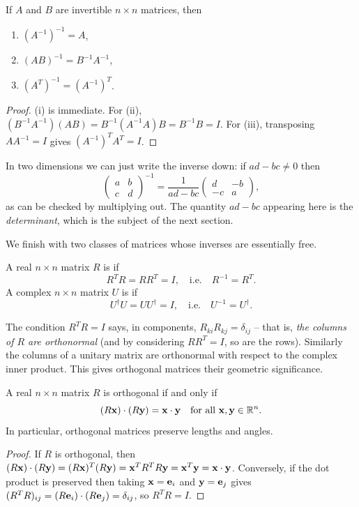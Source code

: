 \documentclass[a4paper]{scrartcl}
\begin{document}
\begin{proposition}
	If $A$ and $B$ are invertible $n \times n$ matrices, then
	\begin{enumerate}[label=(\roman*)]
		\item $(A^{-1})^{-1} = A$,
		\item $(AB)^{-1} = B^{-1}A^{-1}$,
		\item $(A^T)^{-1} = (A^{-1})^T$.
	\end{enumerate}
\end{proposition}
\begin{proof}
	(i) is immediate. For (ii), $(B^{-1}A^{-1})(AB) = B^{-1}(A^{-1}A)B = B^{-1}B = I$. For (iii), transposing $A A^{-1} = I$ gives $(A^{-1})^T A^T = I$.
\end{proof}

In two dimensions we can just write the inverse down: if $ad - bc \neq 0$ then
$$
\begin{pmatrix}
	a & b \\ c & d
\end{pmatrix}^{-1}
= \frac{1}{ad - bc}\begin{pmatrix}
	d & -b \\ -c & a
\end{pmatrix},
$$
as can be checked by multiplying out. The quantity $ad - bc$ appearing here is the \emph{determinant}, which is the subject of the next section.

We finish with two classes of matrices whose inverses are essentially free.

\begin{definition}
	A real $n \times n$ matrix $R$ is  if
	$$
	R^T R = R R^T = I, \quad \text{i.e.} \quad R^{-1} = R^T.
	$$
	A complex $n \times n$ matrix $U$ is  if
	$$
	U^\dagger U = U U^\dagger = I, \quad \text{i.e.} \quad U^{-1} = U^\dagger.
	$$
\end{definition}

The condition $R^TR = I$ says, in components, $R_{ki}R_{kj} = \delta_{ij}$ -- that is, \emph{the columns of $R$ are orthonormal} (and by considering $RR^T = I$, so are the rows). Similarly the columns of a unitary matrix are orthonormal with respect to the complex inner product. This gives orthogonal matrices their geometric significance.

\begin{proposition}
	A real $n \times n$ matrix $R$ is orthogonal if and only if
	$$
	(R\mathbf{x}) \cdot (R \mathbf{y}) = \mathbf{x} \cdot \mathbf{y} \quad \text{for all } \mathbf{x}, \mathbf{y} \in \mathbb{R}^n.
	$$
	In particular, orthogonal matrices preserve lengths and angles.
\end{proposition}
\begin{proof}
	If $R$ is orthogonal, then $(R\mathbf{x}) \cdot (R\mathbf{y}) = (R\mathbf{x})^T (R\mathbf{y}) = \mathbf{x}^T R^T R \mathbf{y} = \mathbf{x}^T \mathbf{y} = \mathbf{x} \cdot \mathbf{y}$. Conversely, if the dot product is preserved then taking $\mathbf{x} = \mathbf{e}_i$ and $\mathbf{y} = \mathbf{e}_j$ gives $(R^TR)_{ij} = (R\mathbf{e}_i)\cdot(R\mathbf{e}_j) = \delta_{ij}$, so $R^T R = I$.

\end{proof}
\end{document}
